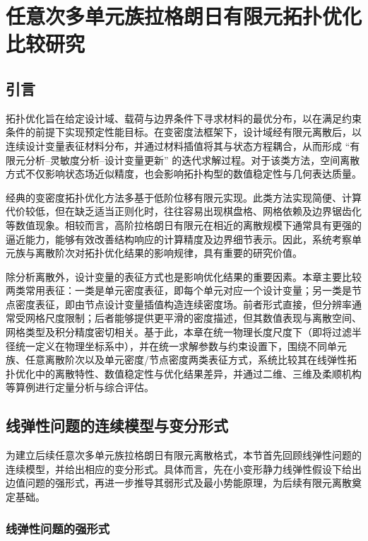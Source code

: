 \chapter{任意次多单元族拉格朗日有限元拓扑优化比较研究}
\label{chap:lagrange_comparison}


\section{引言}
\label{sec:ch3_intro}

拓扑优化旨在给定设计域、载荷与边界条件下寻求材料的最优分布，以在满足约束条件的前提下实现预定性能目标。在变密度法框架下，设计域经有限元离散后，以连续设计变量表征材料分布，并通过材料插值将其与状态方程耦合，从而形成 “有限元分析{--}灵敏度分析{--}设计变量更新” 的迭代求解过程。对于该类方法，空间离散方式不仅影响状态场近似精度，也会影响拓扑构型的数值稳定性与几何表达质量。

经典的变密度拓扑优化方法多基于低阶位移有限元实现。此类方法实现简便、计算代价较低，但在缺乏适当正则化时，往往容易出现棋盘格、网格依赖及边界锯齿化等数值现象。相较而言，高阶拉格朗日有限元在相近的离散规模下通常具有更强的逼近能力，能够有效改善结构响应的计算精度及边界细节表示。因此，系统考察单元族与离散阶次对拓扑优化结果的影响规律，具有重要的研究价值。

除分析离散外，设计变量的表征方式也是影响优化结果的重要因素。本章主要比较两类常用表征：一类是单元密度表征，即每个单元对应一个设计变量；另一类是节点密度表征，即由节点设计变量插值构造连续密度场。前者形式直接，但分辨率通常受网格尺度限制；后者能够提供更平滑的密度描述，但其数值表现与离散空间、网格类型及积分精度密切相关。基于此，本章在统一物理长度尺度下（即将过滤半径统一定义在物理坐标系中），并在统一求解参数与约束设置下，围绕不同单元族、任意离散阶次以及单元密度/节点密度两类表征方式，系统比较其在线弹性拓扑优化中的离散特性、数值稳定性与优化结果差异，并通过二维、三维及柔顺机构等算例进行定量分析与综合评估。


\section{线弹性问题的连续模型与变分形式}
\label{sec:linear_elastic}

为建立后续任意次多单元族拉格朗日有限元离散格式，本节首先回顾线弹性问题的连续模型，并给出相应的变分形式。具体而言，先在小变形静力线弹性假设下给出边值问题的强形式，再进一步推导其弱形式及最小势能原理，为后续有限元离散奠定基础。


\subsection{线弹性问题的强形式}
\label{subsec:elastic_strong}

